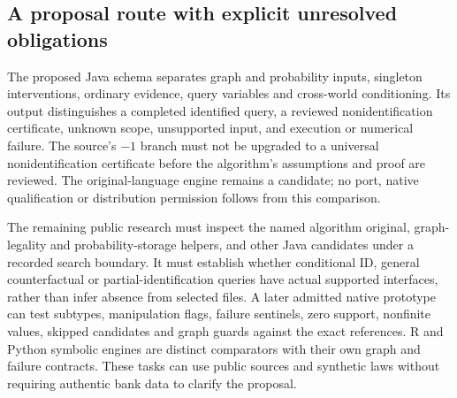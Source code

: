 \subsection{A proposal route with explicit unresolved obligations}

The proposed Java schema separates graph and probability inputs, singleton
interventions, ordinary evidence, query variables and cross-world conditioning.
Its output distinguishes a completed identified query, a reviewed
nonidentification certificate, unknown scope, unsupported input, and execution
or numerical failure. The source's $-1$ branch must not be upgraded to a
universal nonidentification certificate before the algorithm's assumptions and
proof are reviewed. The original-language engine remains a candidate; no port,
native qualification or distribution permission follows from this comparison.

The remaining public research must inspect the named algorithm original,
graph-legality and probability-storage helpers, and other Java candidates under
a recorded search boundary. It must establish whether conditional ID, general
counterfactual or partial-identification queries have actual supported
interfaces, rather than infer absence from selected files. A later admitted
native prototype can test subtypes, manipulation flags, failure sentinels, zero
support, nonfinite values, skipped candidates and graph guards against the
exact references. R and Python symbolic engines are distinct comparators with
their own graph and failure contracts. These tasks can use public sources and
synthetic laws without requiring authentic bank data to clarify the proposal.
